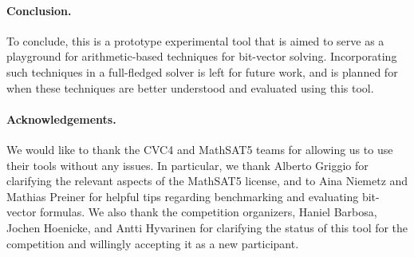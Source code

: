 \documentclass{easychair}
\newcommand{\msat}{MathSAT5\xspace}
\newcommand{\cvcfour}{CVC4\xspace}
\begin{document}
\paragraph{Conclusion.}
To conclude, this is a prototype experimental tool that is aimed to serve as a
playground for arithmetic-based techniques for bit-vector solving. Incorporating
such techniques in a full-fledged solver is left for future work, and is planned
for when these techniques are better understood and evaluated using this tool.

\paragraph{Acknowledgements.} We would like to thank the \cvcfour and \msat teams for allowing us
to use their tools without any issues. In particular, we thank Alberto Griggio
for clarifying the relevant aspects of the \msat license, and to Aina Niemetz
and Mathias Preiner for helpful tips regarding benchmarking and evaluating
bit-vector formulas. We also thank the competition organizers, Haniel Barbosa,
Jochen Hoenicke, and Antti Hyvarinen for clarifying the status of this tool for
the competition and willingly accepting it as a new participant.



  
  
\end{document}
